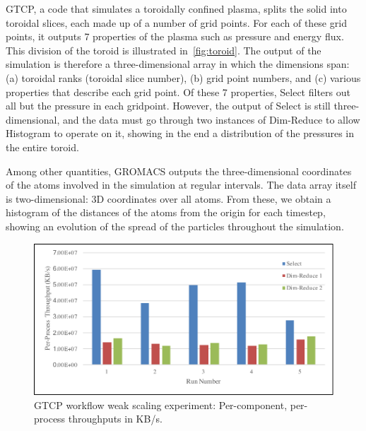 GTCP, a code that simulates a toroidally confined plasma, splits the solid into
toroidal slices, each made up of a number of grid points. For each of these
grid points, it outputs 7 properties of the plasma such as pressure and energy
flux. This division of the toroid is illustrated in~\autoref{fig:toroid}.
The output of the simulation is therefore a three-dimensional array in which
the dimensions span: (a) toroidal ranks (toroidal slice number), (b) grid point
numbers, and (c) various properties that describe each grid point.
Of these 7 properties, Select filters out all but the pressure in each gridpoint.
However, the output of Select is still three-dimensional, and the
data must go through two instances of Dim-Reduce to allow
Histogram to operate on it, showing in the end
a distribution of the pressures in the entire toroid.

Among other quantities, GROMACS outputs
the three-dimensional coordinates
of the atoms involved in the simulation
at regular intervals.
The data array itself is two-dimensional:
3D coordinates over all atoms.
From these, we obtain a histogram of the distances
of the atoms from the origin for each timestep, showing
an evolution of the spread of the particles throughout
the simulation.

\begin{figure}
\includegraphics[width=\columnwidth]{fig/per-component-throughput}
\caption{GTCP workflow weak scaling experiment: Per-component, per-process throughputs in KB/s.}
\label{fig:gtcp-weak-perc}
\end{figure}


